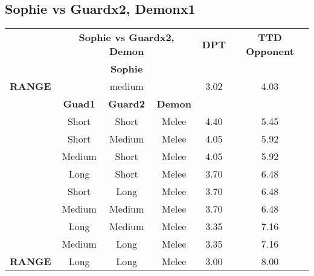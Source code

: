 \subsection{Sophie vs Guardx2, Demonx1}
\begin{table}[H]
\begin{tabular}{c|c|c|c|c|c|}
\cline{2-6}
\rowcolor[HTML]{C0C0C0} 
\cellcolor[HTML]{FFFFFF}\textbf{} & \multicolumn{3}{c|}{\cellcolor[HTML]{C0C0C0}\textbf{Sophie vs Guardx2, Demon}} & \textbf{DPT} & \textbf{TTD Opponent} \\ \cline{2-6} 
 & \multicolumn{3}{c|}{\textbf{Sophie}} & \multicolumn{2}{c|}{} \\ \hline
\multicolumn{1}{|c|}{\cellcolor[HTML]{C0C0C0}\textbf{RANGE}} & \multicolumn{3}{c|}{medium} & 3.02 & 4.03 \\ \hline
 & \textbf{Guad1} & \textbf{Guard2} & \textbf{Demon} & \multicolumn{2}{c|}{} \\ \hline
\multicolumn{1}{|c|}{\cellcolor[HTML]{C0C0C0}} & Short & Short & Melee & 4.40 & 5.45 \\ \cline{2-6} 
\multicolumn{1}{|c|}{\cellcolor[HTML]{C0C0C0}} & Short & Medium & Melee & 4.05 & 5.92 \\ \cline{2-6} 
\multicolumn{1}{|c|}{\cellcolor[HTML]{C0C0C0}} & Medium & Short & Melee & 4.05 & 5.92 \\ \cline{2-6} 
\multicolumn{1}{|c|}{\cellcolor[HTML]{C0C0C0}} & Long & Short & Melee & 3.70 & 6.48 \\ \cline{2-6} 
\multicolumn{1}{|c|}{\cellcolor[HTML]{C0C0C0}} & Short & Long & Melee & 3.70 & 6.48 \\ \cline{2-6} 
\multicolumn{1}{|c|}{\cellcolor[HTML]{C0C0C0}} & Medium & Medium & Melee & 3.70 & 6.48 \\ \cline{2-6} 
\multicolumn{1}{|c|}{\cellcolor[HTML]{C0C0C0}} & Long & Medium & Melee & 3.35 & 7.16 \\ \cline{2-6} 
\multicolumn{1}{|c|}{\cellcolor[HTML]{C0C0C0}} & Medium & Long & Melee & 3.35 & 7.16 \\ \cline{2-6} 
\multicolumn{1}{|c|}{\multirow{-9}{*}{\cellcolor[HTML]{C0C0C0}\textbf{RANGE}}} & Long & Long & Melee & 3.00 & 8.00 \\ \hline
\end{tabular}
\end{table}
